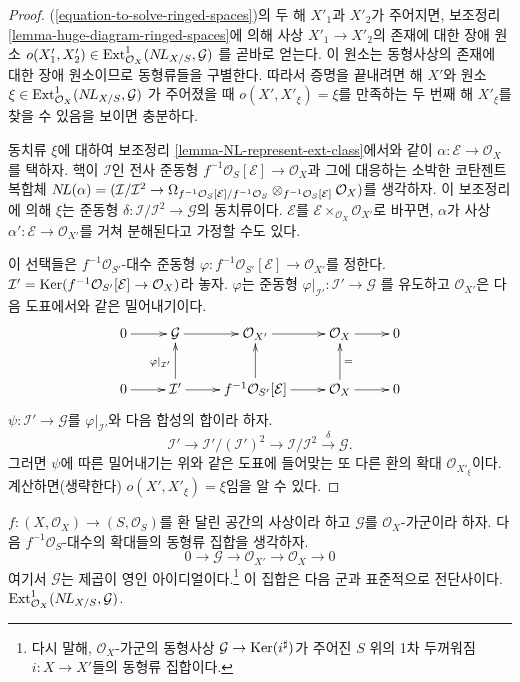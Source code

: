 \begin{proof}
(\ref{equation-to-solve-ringed-spaces})의 두 해 $X'_1$과 $X'_2$가
주어지면, 보조정리 \ref{lemma-huge-diagram-ringed-spaces}에 의해
사상 $X'_1 \to X'_2$의 존재에 대한 장애 원소
$o(X'_1, X'_2) \in \mathop{\mathrm{Ext}}\nolimits^1_{\mathcal{O}_X}(\mathop{N\!L}\nolimits_{X/S}, \mathcal{G})$
를 곧바로 얻는다. 이 원소는 동형사상의 존재에 대한 장애 원소이므로
동형류들을 구별한다. 따라서 증명을 끝내려면 해 $X'$와 원소
$\xi \in \mathop{\mathrm{Ext}}\nolimits^1_{\mathcal{O}_X}(\mathop{N\!L}\nolimits_{X/S}, \mathcal{G})$
가 주어졌을 때 $o(X', X'_\xi) = \xi$를 만족하는 두 번째 해
$X'_\xi$를 찾을 수 있음을 보이면 충분하다.

\medskip\noindent
동치류 $\xi$에 대하여 보조정리
\ref{lemma-NL-represent-ext-class}에서와 같이
$\alpha : \mathcal{E} \to \mathcal{O}_X$를 택하자. 핵이
$\mathcal{I}$인 전사 준동형
$f^{-1}\mathcal{O}_S[\mathcal{E}] \to \mathcal{O}_X$과 그에 대응하는
소박한 코탄젠트 복합체
$\mathop{N\!L}\nolimits(\alpha) = (\mathcal{I}/\mathcal{I}^2 \to
\Omega_{f^{-1}\mathcal{O}_S[\mathcal{E}]/f^{-1}\mathcal{O}_S}
\otimes_{f^{-1}\mathcal{O}_S[\mathcal{E}]} \mathcal{O}_X)$를 생각하자.
이 보조정리에 의해 $\xi$는 준동형
$\delta : \mathcal{I}/\mathcal{I}^2 \to \mathcal{G}$의 동치류이다.
$\mathcal{E}$를
$\mathcal{E} \times_{\mathcal{O}_X} \mathcal{O}_{X'}$로 바꾸면,
$\alpha$가 사상 $\alpha' : \mathcal{E} \to \mathcal{O}_{X'}$를 거쳐
분해된다고 가정할 수도 있다.

\medskip\noindent
이 선택들은 $f^{-1}\mathcal{O}_{S'}$-대수 준동형
$\varphi : f^{-1}\mathcal{O}_{S'}[\mathcal{E}] \to \mathcal{O}_{X'}$를
정한다. $\mathcal{I}' =
\mathop{\mathrm{Ker}}(f^{-1}\mathcal{O}_{S'}[\mathcal{E}] \to \mathcal{O}_X)$라 놓자.
$\varphi$는 준동형
$\varphi|_{\mathcal{I}'} : \mathcal{I}' \to \mathcal{G}$
를 유도하고 $\mathcal{O}_{X'}$은 다음 도표에서와 같은 밀어내기이다.
$$
\xymatrix{
0 \ar[r] & \mathcal{G} \ar[r] & \mathcal{O}_{X'} \ar[r] &
\mathcal{O}_X \ar[r] & 0 \\
0 \ar[r] & \mathcal{I}' \ar[u]^{\varphi|_{\mathcal{I}'}} \ar[r] &
f^{-1}\mathcal{O}_{S'}[\mathcal{E}] \ar[u] \ar[r] &
\mathcal{O}_X \ar[u]_{=} \ar[r] & 0
}
$$
$\psi : \mathcal{I}' \to \mathcal{G}$를
$\varphi|_{\mathcal{I}'}$와 다음 합성의 합이라 하자.
$$
\mathcal{I}' \to \mathcal{I}'/(\mathcal{I}')^2 \to
\mathcal{I}/\mathcal{I}^2 \xrightarrow{\delta} \mathcal{G}.
$$
그러면 $\psi$에 따른 밀어내기는 위와 같은 도표에 들어맞는 또 다른
환의 확대 $\mathcal{O}_{X'_\xi}$이다. 계산하면(생략한다)
$o(X', X'_\xi) = \xi$임을 알 수 있다.
\end{proof}

\begin{lemma}
\label{lemma-extensions-of-relative-ringed-spaces}
$f : (X, \mathcal{O}_X) \to (S, \mathcal{O}_S)$를 환 달린 공간의
사상이라 하고 $\mathcal{G}$를 $\mathcal{O}_X$-가군이라 하자.
다음 $f^{-1}\mathcal{O}_S$-대수의 확대들의 동형류 집합을 생각하자.
$$
0 \to \mathcal{G} \to \mathcal{O}_{X'} \to \mathcal{O}_X \to 0
$$
여기서 $\mathcal{G}$는 제곱이 영인 아이디얼이다.\footnote{다시 말해,
$\mathcal{O}_X$-가군의 동형사상
$\mathcal{G} \to \mathop{\mathrm{Ker}}(i^\sharp)$가 주어진 $S$ 위의 1차 두꺼워짐
$i : X \to X'$들의 동형류 집합이다.}
이 집합은 다음 군과 표준적으로 전단사이다.
$\mathop{\mathrm{Ext}}\nolimits^1_{\mathcal{O}_X}(\mathop{N\!L}\nolimits_{X/S}, \mathcal{G})$.
\end{lemma}

